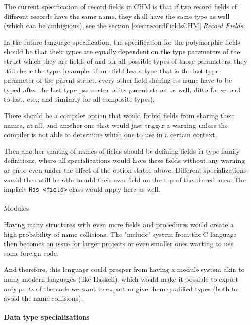 The current specification of record fields in CHM is that if two record fields of different records have the same name, they shall have the same type as well (which can be ambiguous), see the section \ref{ssec:recordFieldsCHM} \emph{Record Fields}.

In the future language specification, the specification for the polymorphic fields should be that their types are equally dependent on the type parameters of the struct which they are fields of and for all possible types of those parameters, they still share the type (example: if one field has a type that is the last type parameter of the parent struct, every other field sharing its name have to be typed after the last type parameter of its parent struct as well, ditto for second to last, etc.; and similarly for all composite types).

There should be a compiler option that would forbid fields from sharing their names, at all, and another one that would just trigger a warning unless the compiler is not able to determine which one to use in a certain context.

Then another sharing of names of fields should be defining fields in type family definitions, where all specializations would have these fields without any warning or error even under the effect of the option stated above. Different specializations would then still be able to add their own field on the top of the shared ones. The implicit \lstinline{Has_<field>} class would apply here as well.

\paragraph{}{Modules}

Having many structures with even more fields and procedures would create a high probability of name collisions. The "include" system from the C language then becomes an issue for larger projects or even smaller ones wanting to use some foreign code.

And therefore, this language could prosper from having a module system akin to many modern languages (like Haskell), which would make it possible to export only parts of the code we want to export or give them qualified types (both to avoid the name collisions).

\paragraph{Data type specializations}

